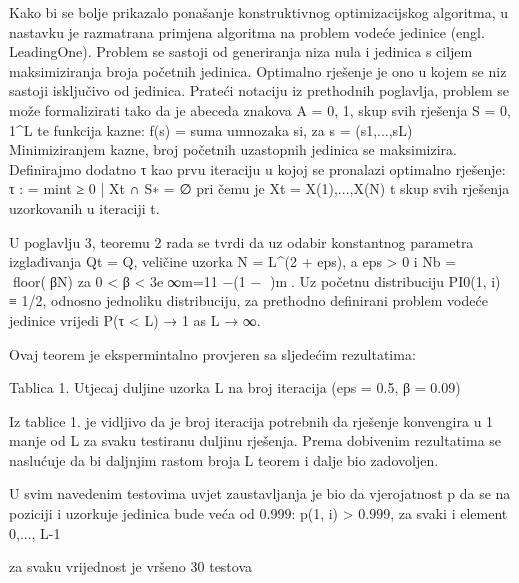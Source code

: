 Kako bi se bolje prikazalo ponašanje konstruktivnog optimizacijskog algoritma, u nastavku je razmatrana primjena algoritma na
problem vodeće jedinice (engl. LeadingOne). Problem se sastoji od generiranja niza nula i jedinica s ciljem maksimiziranja broja početnih jedinica. Optimalno
rješenje je ono u kojem se niz sastoji isključivo od jedinica. Prateći notaciju iz prethodnih poglavlja, problem se može formalizirati tako da
je abeceda znakova A = {0, 1}, skup svih rješenja S = {0, 1}^L te funkcija kazne:
f(s) = suma umnozaka si, za s = (s1,...,sL)
Minimiziranjem kazne, broj početnih uzastopnih jedinica se maksimizira.
Definirajmo dodatno τ kao prvu iteraciju u kojoj se pronalazi optimalno rješenje:
τ : = min{t ≥ 0 | Xt ∩ S∗ = ∅}
pri čemu je Xt =  {X(1),...,X(N) t } skup svih rješenja uzorkovanih u iteraciji t.

U poglavlju 3, teoremu 2 rada se tvrdi da uz odabir konstantnog parametra izglađivanja Qt = Q, veličine uzorka N = L^(2 + eps), a eps > 0 i
Nb = floor(βN) za 0 < β < 3e∞m=11 −(1 − )m. Uz početnu distribuciju PI0(1, i) ≡ 1/2, odnosno jednoliku distribuciju, za prethodno definirani
problem vodeće jedinice vrijedi P(τ < L) → 1 as L → ∞.

Ovaj teorem je ekspermintalno provjeren sa sljedećim rezultatima:

Tablica 1. Utjecaj duljine uzorka L na broj iteracija (eps = 0.5, β = 0.09)

Iz tablice 1. je vidljivo da je broj iteracija potrebnih da rješenje konvengira u 1 manje od L za svaku testiranu duljinu rješenja. Prema dobivenim rezultatima
se naslućuje da bi daljnjim rastom broja L teorem i dalje bio zadovoljen.







U svim navedenim testovima uvjet zaustavljanja je bio da vjerojatnost p da se na poziciji i uzorkuje jedinica bude veća od 0.999:
p(1, i) > 0.999, za svaki  i element {0,..., L-1}




za svaku vrijednost je vršeno 30 testova
